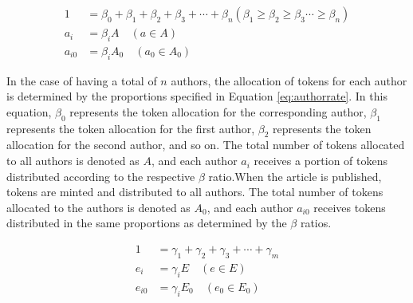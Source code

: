 \documentclass[lettersize,journal]{IEEEtran}
\begin{document}
\begin{equation}
  \begin{aligned}
    1 &= \beta_0 + \beta_1 + \beta_2 + \beta_3 + \cdots + \beta_n (\beta_1 \geq  \beta_2 \geq \beta_3 \cdots \geq \beta_n)\\
    a_{i} &= \beta_i A \quad (a \in A) \\
    a_{i0} &= \beta_i A_0 \quad (a_0 \in A_0 )
  \end{aligned}
  \label{eq:authorrate}
\end{equation}

In the case of having a total of $n$ authors, the allocation of tokens for each author is determined by the proportions specified in Equation \ref{eq:authorrate}. In this equation, $\beta_0$ represents the token allocation for the corresponding author, $\beta_1$ represents the token allocation for the first author, $\beta_2$ represents the token allocation for the second author, and so on. The total number of tokens allocated to all authors is denoted as $A$, and each author $a_i$ receives a portion of tokens distributed according to the respective $\beta$ ratio.When the article is published, tokens are minted and distributed to all authors. The total number of tokens allocated to the authors is denoted as $A_0$, and each author $a_{i0}$ receives tokens distributed in the same proportions as determined by the $\beta$ ratios.

\begin{equation}
  \begin{aligned}
    1 &= \gamma_1 + \gamma_2 + \gamma_3 + \cdots + \gamma_m \\
    e_{i} &= \gamma_i E \quad (e \in E) \\
    e_{i0} &= \gamma_i E_0 \quad (e_0 \in E_0 )
  \end{aligned}
  \label{eq:reviewerrate}
\end{equation}
\end{document}
